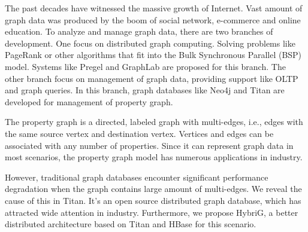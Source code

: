\begin{eabstract}
	The past decades have witnessed the massive growth of Internet. Vast amount of graph data was produced by the boom of social network, e-commerce and online education. To analyze and manage graph data, there are two branches of development. One focus on distributed graph computing. Solving problems like PageRank or other algorithms that fit into the Bulk Synchronous Parallel (BSP) model. Systems like Pregel and GraphLab are proposed for this branch. The other branch focus on management of graph data, providing support like OLTP and graph queries. In this branch, graph databases like Neo4j and Titan are developed for management of property graph.

	The property graph is a directed, labeled graph with multi-edges, i.e., edges with the same source vertex and destination vertex. Vertices and edges can be associated with any number of properties. Since it can represent graph data in most scenarios, the property graph model has numerous applications in industry. 

	However, traditional graph databases encounter significant performance degradation when the graph contains large amount of multi-edges. 
	We reveal the cause of this in Titan. It’s an open source distributed graph database, which has attracted wide attention in industry. Furthermore, we propose HybriG, a better distributed architecture based on Titan and HBase for this scenario. 


\end{eabstract}
